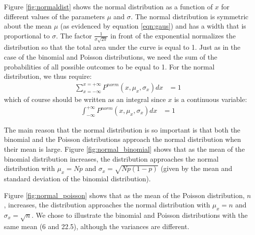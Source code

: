 Figure \ref{fig:normaldist} shows the normal distribution as a function of $x$ for different values of the parameters $\mu$ and $\sigma$. The normal distribution is symmetric about the mean $\mu$ (as evidenced by equation \ref{eqn:gaus}) and has a width that is proportional to $\sigma$. The factor $\frac{1}{\sigma\sqrt{2\pi}}$ in front of the exponential normalizes the distribution so that the total area under the curve is equal to 1. Just as in the case of the binomial and Poisson distributions, we need the sum of the probabilities of all possible outcomes to be equal to 1. For the normal distribution, we thus require:
\begin{align*}
\sum_{x=-\infty}^{x=+\infty}P^{norm}(x,\mu_x,\sigma_x)dx &=1
\end{align*}
which of course should be written as an integral since $x$ is a continuous variable:
\begin{align}
\int_{-\infty}^{+\infty}P^{norm}(x,\mu_x,\sigma_x)dx &=1
\end{align}

The main reason that the normal distribution is so important is that both the binomial and the Poisson distributions approach the normal distribution when their mean is large. Figure \ref{fig:normal_binomial} shows that as the mean of the binomial distribution increases, the distribution approaches the normal distribution with $\mu_x=Np$  and $\sigma_x=\sqrt{Np(1-p)}$ (given by the mean and standard deviation of the binomial distribution).

 Figure \ref{fig:normal_poisson} shows that as the mean of the Poisson distribution, $n$, increases, the distribution approaches the normal distribution with $\mu_x=n$  and $\sigma_x=\sqrt{n}$. We chose to illustrate the binomial and Poisson distributions with the same mean (6 and 22.5), although the variances are different.


